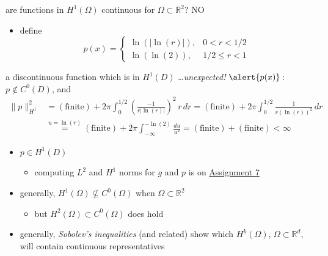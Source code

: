 \documentclass[10pt,
               svgnames,
               hyperref={colorlinks,
                         citecolor=DeepPink4,
                         linkcolor=FireBrick,
                         urlcolor=blue},
               usepdftitle=false]{beamer}
\newcommand{\RR}{\mathbb{R}}
\begin{document}
\begin{frame}{are functions in $H^1(\Omega)$ continuous for $\Omega\subset\RR^2$? \quad NO}

\begin{itemize}
\item define
	$$p(x) = \begin{cases} \ln(|\ln(r)|), & 0 < r < 1/2 \\
	                       \ln(\ln(2)), & 1/2 \le r < 1 \end{cases}$$
\end{itemize}

\begin{block}{a discontinuous function \alert{which is in} $H^1(D)$ \dots \emph{unexpected!}}
{\small
$\alert{p(x)}$\,: \, $p\notin C^0(D)$, and
\begin{align*}
\|p\|_{H^1}^2 &= (\text{finite}) + 2\pi \int_0^{1/2} \left(\frac{-1}{r|\ln(r)|}\right)^2\, r\,dr = (\text{finite}) + 2\pi \int_0^{1/2} \frac{1}{r(\ln(r))^2} \,dr \\
&\stackrel{u=\ln(r)}{=} (\text{finite}) + 2\pi \int_{-\infty}^{-\ln(2)} \frac{du}{u^2} = (\text{finite}) + (\text{finite}) < \infty
\end{align*}
}
\end{block}

\begin{itemize}
\item \alert{$p\in H^1(D)$}
    \begin{itemize}
    \item[$\circ$] computing $L^2$ and $H^1$ norms for $g$ and $p$ is on \href{https://bueler.github.io/fa/assets/homework/S26/A7.pdf}{Assignment 7}
    \end{itemize}
\item generally, \alert{$H^1(\Omega) \nsubseteq C^0(\Omega)$ when $\Omega \subset \RR^2$}
    \begin{itemize}
    \item[$\circ$] but $H^2(\Omega) \subset C^0(\Omega)$ does hold
    \end{itemize}
\item generally, \emph{Sobolev's inequalities} (and related) show which $H^k(\Omega)$, $\Omega\subset\RR^d$, will contain continuous representatives
\end{itemize}
\end{frame}
\end{document}
